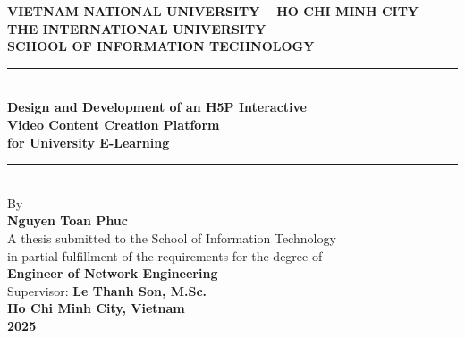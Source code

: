 \documentclass[12pt,a4paper,oneside]{report}
\begin{document}

\begin{titlepage}
  \begin{center}
    \textbf{VIETNAM NATIONAL UNIVERSITY -- HO CHI MINH CITY}\\[4pt]
    \textbf{THE INTERNATIONAL UNIVERSITY}\\[4pt]
    \textbf{SCHOOL OF INFORMATION TECHNOLOGY}\\[30pt]

    \rule{\linewidth}{1pt}\\[10pt]
    {\LARGE\bfseries Design and Development of an H5P Interactive\\[6pt]
    Video Content Creation Platform\\[6pt]
    for University E-Learning}\\[10pt]
    \rule{\linewidth}{1pt}\\[30pt]

    \large By\\[8pt]
    {\Large\bfseries Nguyen Toan Phuc}\\[30pt]

    \normalsize
    A thesis submitted to the School of Information Technology\\
    in partial fulfillment of the requirements for the degree of\\
    \textbf{Engineer of Network Engineering}\\[20pt]

    Supervisor: \textbf{Le Thanh Son, M.Sc.}\\[30pt]

    \textbf{Ho Chi Minh City, Vietnam}\\
    \textbf{2025}
  \end{center}
\end{titlepage}
\end{document}
